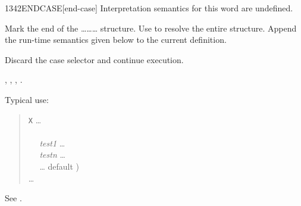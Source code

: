 \begin{worddef}{1342}{ENDCASE}[end-case]
\interpret
	Interpretation semantics for this word are undefined.

\compile

	Mark the end of the
	\ldots{}\ldots{}\ldots{}
	structure. Use  to resolve the entire structure.
	Append the run-time semantics given below to the current
	definition.

\runtime

	Discard the case selector  and continue execution.

\see {},
	,
	,
	.

	\begin{rationale} %
		Typical use:
		\begin{quote}
			\word{:} \texttt{X} {\ldots} \\
			\tab {} \\
			\tab~~ \emph{test1}  {\ldots}  \\
			\tab~~ \emph{testn}  {\ldots}  \\
			\tab~~ {\ldots}  default ) \\
			\tab {} {\ldots} \\
			\word{;}
		\end{quote}
	\end{rationale}

	\begin{testing}
		See .
	\end{testing}
\end{worddef}


